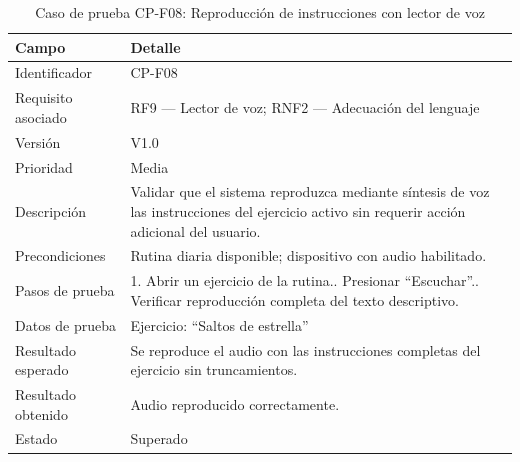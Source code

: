 				\begin{table}[H]
					\centering\small
					\caption{Caso de prueba CP-F08: Reproducción de instrucciones con lector de voz}
					\label{tab:cpf08}
					\begin{tabular}{p{3cm}p{12.0cm}}
						\hline
						\textbf{Campo} & \textbf{Detalle}\\
						\hline
						Identificador & CP-F08\\
						Requisito asociado & RF9 --- Lector de voz; RNF2 --- Adecuación del lenguaje\\
						Versión & V1.0\\
						Prioridad & Media\\
						Descripción & Validar que el sistema reproduzca mediante síntesis de voz las instrucciones del ejercicio activo sin requerir acción adicional del usuario.\\
						Precondiciones & Rutina diaria disponible; dispositivo con audio habilitado.\\
						Pasos de prueba & 1. Abrir un ejercicio de la rutina.\newline 2. Presionar ``Escuchar''.\newline 3. Verificar reproducción completa del texto descriptivo.\\
						Datos de prueba & Ejercicio: ``Saltos de estrella''\\
						Resultado esperado & Se reproduce el audio con las instrucciones completas del ejercicio sin truncamientos.\\
						Resultado obtenido & Audio reproducido correctamente.\\
						Estado & Superado\\
						\hline
					\end{tabular}
				\end{table}
				\tblnote
				
